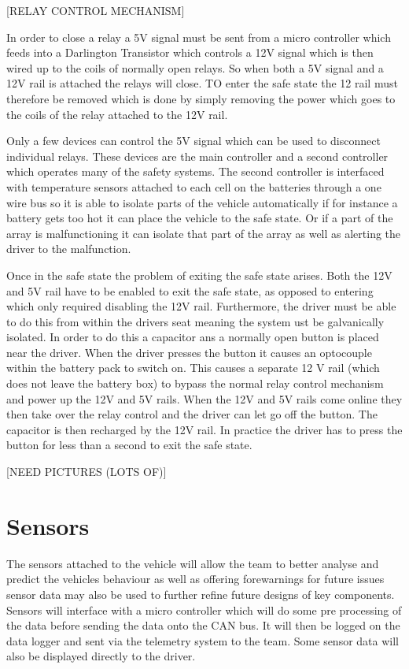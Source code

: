\documentclass[10pt,a4paper]{article}
\begin{document}
[RELAY CONTROL MECHANISM]

In order to close a relay a 5V signal must be sent from a micro controller which feeds into a Darlington Transistor which controls a 12V signal which is then wired up to the coils of normally open relays. So when both a 5V signal and a 12V rail is attached the relays will close. TO enter the safe state the 12 rail must therefore be removed which is done by simply removing the power which goes to the coils of the relay attached to the 12V rail.

Only a few devices can control the 5V signal which can be used to disconnect individual relays. These devices are the main controller and a second controller which operates many of the safety systems. The second controller is interfaced with temperature sensors attached to each cell on the batteries through a one wire bus so it is able to isolate parts of the vehicle automatically if for instance a battery gets too hot it can place the vehicle to the safe state. Or if a part of the array is malfunctioning it can isolate that part of the array as well as alerting the driver to the malfunction.

Once in the safe state the problem of exiting the safe state arises. Both the 12V and 5V rail have to be enabled to exit the safe state, as opposed to entering which only required disabling the 12V rail. Furthermore, the driver must be able to do this from within the drivers seat meaning the system ust be galvanically isolated. In order to do this a capacitor ans a normally open button is placed near the driver. When the driver presses the button it causes an optocouple within the battery pack to switch on. This causes a separate 12 V rail (which does not leave the battery box) to bypass the normal relay control mechanism and power up the 12V and 5V rails. When the 12V and 5V rails come online they then take over the relay control and the driver can let go off the button. The capacitor is then recharged by the 12V rail. In practice the driver has to press the button for less than a second to exit the safe state. 

[NEED PICTURES (LOTS OF)]

\section{Sensors}
The sensors attached to the vehicle will allow the team to better analyse and predict the vehicles behaviour as well as offering forewarnings for future issues sensor data may also be used to further refine future designs of key components. Sensors will interface with a micro controller which will do some pre processing of the data before sending the data onto the CAN bus. It will then be logged on the data logger and sent via the telemetry system to the team. Some sensor data will also be displayed directly to the driver. 
\end{document}
